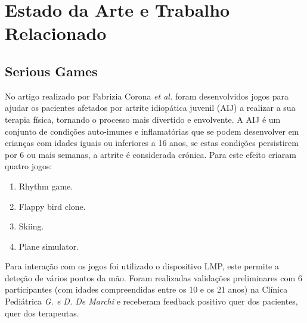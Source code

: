 \documentclass{TTUPhD}
\begin{document}
\section{Estado da Arte e Trabalho Relacionado}

\subsection{Serious Games}

No artigo realizado por Fabrizia Corona \textit{et al.} \cite{rehability} foram desenvolvidos jogos para ajudar os pacientes afetados por
artrite idiopática juvenil (AIJ) a realizar a sua terapia física, tornando o processo mais divertido e envolvente.
A AIJ é um conjunto de condições auto-imunes e inflamatórias que se podem desenvolver em crianças com idades
iguais ou inferiores a 16 anos, se estas condições persistirem por 6 ou mais semanas, a artrite é considerada crónica.
Para este efeito criaram quatro jogos:

\begin{enumerate}[label=\alph*)]
    \item Rhythm game.
    \item Flappy bird clone.
    \item Skiing.
    \item Plane simulator.
\end{enumerate}

\begin{figure}[h!]
    \center
\end{figure}

Para interação com os jogos foi utilizado o dispositivo LMP, este permite a deteção de vários pontos da mão.
Foram realizadas validações preliminares com 6 participantes (com idades compreendidas entre os 10 e os 21 anos) na Clínica Pediátrica \textit{G. e D. De Marchi} e
receberam feedback positivo quer dos pacientes, quer dos terapeutas.\\
\end{document}
